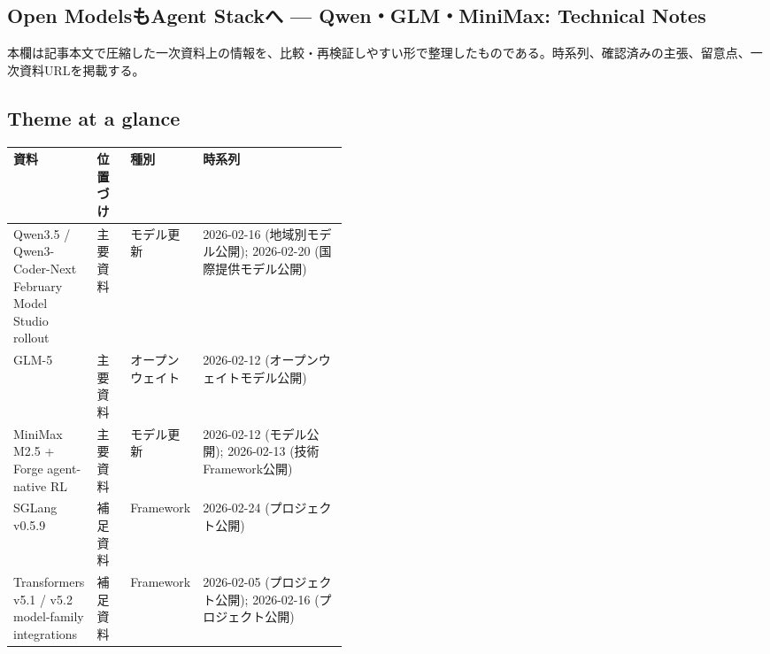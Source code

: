 \subsection*{Open ModelsもAgent Stackへ — Qwen・GLM・MiniMax: Technical Notes}
本欄は記事本文で圧縮した一次資料上の情報を、比較・再検証しやすい形で整理したものである。時系列、確認済みの主張、留意点、一次資料URLを掲載する。
\medskip
\subsection*{Theme at a glance}
\begin{center}
\footnotesize
\begin{tabularx}{\linewidth}{@{}p{0.20\linewidth}p{0.10\linewidth}p{0.14\linewidth}X@{}}
\toprule
資料 & 位置づけ & 種別 & 時系列 \\
\midrule
Qwen3.5 / Qwen3-Coder-Next February Model Studio rollout & 主要資料 & モデル更新 & 2026-02-16 (地域別モデル公開); 2026-02-20 (国際提供モデル公開) \\
GLM-5 & 主要資料 & オープンウェイト & 2026-02-12 (オープンウェイトモデル公開) \\
MiniMax M2.5 + Forge agent-native RL & 主要資料 & モデル更新 & 2026-02-12 (モデル公開); 2026-02-13 (技術Framework公開) \\
SGLang v0.5.9 & 補足資料 & Framework & 2026-02-24 (プロジェクト公開) \\
Transformers v5.1 / v5.2 model-family integrations & 補足資料 & Framework & 2026-02-05 (プロジェクト公開); 2026-02-16 (プロジェクト公開) \\
\bottomrule
\end{tabularx}
\end{center}
\normalsize

